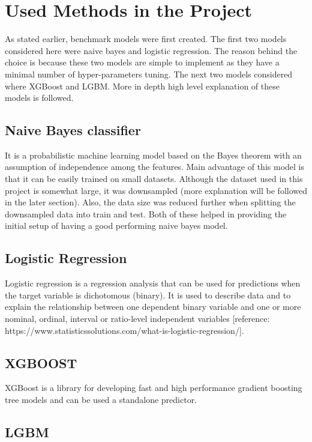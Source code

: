 \documentclass[journal,twoside,web]{ieeecolor}
\begin{document}
\section{Used Methods in the Project}
As stated earlier, benchmark models were first created. The first two models considered here were naive bayes and logistic regression. The reason behind the choice is because these two models are simple to implement as they have a minimal number of hyper-parameters tuning. The next two models considered where XGBoost and LGBM. More in depth high level explanation of these models is followed.  

\subsection{Naive Bayes classifier}
It is a probabilistic machine learning model based on the Bayes theorem with an assumption of independence among the features. Main advantage of this model is that it can be easily trained on small datasets. Although the dataset used in this project is somewhat large, it was downsampled (more explanation will be followed in the later section). Also, the data size was reduced further when splitting the downsampled data into train and test. Both of these helped in providing the initial setup of having a good performing naive bayes model. 

\subsection{Logistic Regression}
Logistic regression is a regression analysis that can be used for predictions when the target variable is dichotomous (binary). It is used to describe data and to explain the relationship between one dependent binary variable and one or more nominal, ordinal, interval or ratio-level independent variables [reference: https://www.statisticssolutions.com/what-is-logistic-regression/].

\subsection{XGBOOST}
XGBoost is a library for developing fast and high performance gradient boosting tree models and can be used a standalone predictor. 

\subsection{LGBM}
\end{document}
